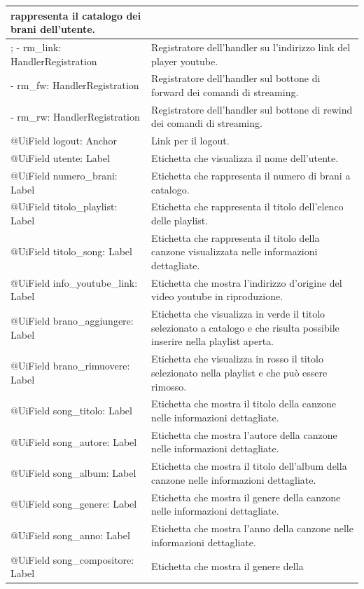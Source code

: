 \begin{longtable}{|p{}|p{}|}
rappresenta il catalogo dei brani dell'utente.\\\hline;
- rm\_link: HandlerRegistration & Registratore dell'handler su
l'indirizzo link del player youtube.\\\hline
- rm\_fw: HandlerRegistration & Registratore dell'handler sul bottone di forward
dei comandi di streaming.\\\hline
- rm\_rw: HandlerRegistration & Registratore dell'handler sul bottone di rewind
dei comandi di streaming.\\\hline
@UiField logout: Anchor & Link per il logout.\\\hline
@UiField utente: Label & Etichetta che visualizza il nome dell'utente.\\\hline
@UiField numero\_brani: Label & Etichetta che rappresenta il numero di
brani a catalogo.\\\hline
@UiField titolo\_playlist: Label & Etichetta che rappresenta il titolo
dell'elenco delle playlist.\\\hline
@UiField titolo\_song: Label & Etichetta che rappresenta il titolo della
canzone visualizzata nelle informazioni dettagliate.\\\hline
@UiField info\_youtube\_link: Label & Etichetta che mostra l'indirizzo
d'origine del video youtube in riproduzione.\\\hline
@UiField brano\_aggiungere: Label & Etichetta che visualizza in verde il
titolo selezionato a catalogo e che risulta possibile inserire nella
playlist aperta.\\\hline
@UiField brano\_rimuovere: Label & Etichetta che visualizza in rosso il
titolo selezionato nella playlist e che pu\`o essere rimosso.\\\hline
@UiField song\_titolo: Label & Etichetta che mostra il titolo della
canzone nelle informazioni dettagliate.\\\hline
@UiField song\_autore: Label & Etichetta che mostra l'autore della
canzone nelle informazioni dettagliate.\\\hline
@UiField song\_album: Label & Etichetta che mostra il titolo dell'album
della canzone nelle informazioni dettagliate.\\\hline
@UiField song\_genere: Label & Etichetta che mostra il genere della
canzone nelle informazioni dettagliate.\\\hline
@UiField song\_anno: Label & Etichetta che mostra l'anno della canzone
nelle informazioni dettagliate.\\\hline
@UiField song\_compositore: Label & Etichetta che mostra il genere della

\end{longtable}
